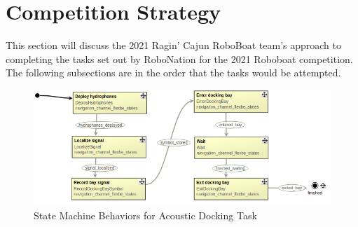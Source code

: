 \documentclass[letterpaper, 12 pt, conference]{ieeeconf}
\begin{document}
\section{Competition Strategy}
This section will discuss the 2021 Ragin' Cajun RoboBoat team's approach to completing the tasks set out by RoboNation for the 2021 Roboboat competition. The following subsections are in the order that the tasks would be attempted.
%
\begin{figure}[t]
\centering
\vspace{0.05in}
\includegraphics[width=2\columnwidth]{Figures/Acoustic_docking_FSM.png}
\caption{State Machine Behaviors for Acoustic Docking Task}
\label{fig:AcousticDocking}
\end{figure}
%
\end{document}
